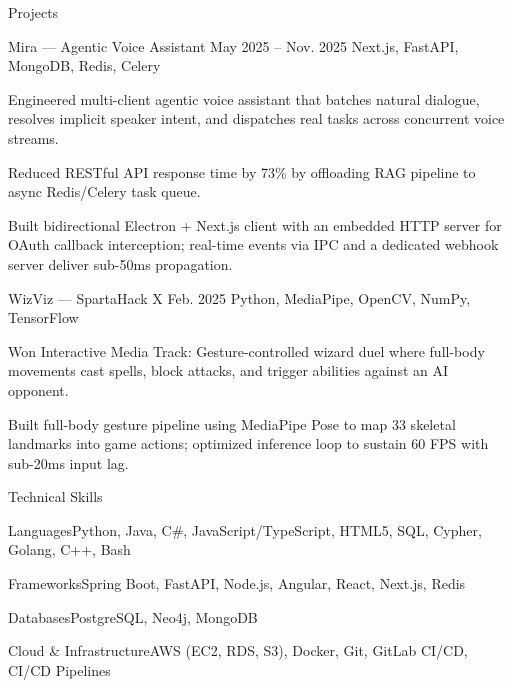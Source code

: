 \documentclass[
	11pt
]{../../../resume}
\begin{document}
	\begin{rSection}{P}{rojects}
		\begin{rSectionEntry}
			{Mira --- Agentic Voice Assistant}
			{May 2025 -- Nov. 2025}
			{}
			{Next.js, FastAPI, MongoDB, Redis, Celery}
			{}

			\item Engineered multi-client agentic voice assistant that batches natural dialogue, resolves implicit speaker intent, and dispatches real tasks across concurrent voice streams.
			\item Reduced RESTful API response time by 73\% by offloading RAG pipeline to async Redis/Celery task queue.
			\item Built bidirectional Electron + Next.js client with an embedded HTTP server for OAuth callback interception; real-time events via IPC and a dedicated webhook server deliver sub-50ms propagation.
		\end{rSectionEntry}

		\begin{rSectionEntry}
			{WizViz --- SpartaHack X}
			{Feb. 2025}
			{}
			{Python, MediaPipe, OpenCV, NumPy, TensorFlow}
			{}

			\item Won Interactive Media Track: Gesture-controlled wizard duel where full-body movements cast spells, block attacks, and trigger abilities against an AI opponent.
			\item Built full-body gesture pipeline using MediaPipe Pose to map 33 skeletal landmarks into game actions; optimized inference loop to sustain 60 FPS with sub-20ms input lag.
		\end{rSectionEntry}
	\end{rSection}

	\begin{rSection}{T}{echnical Skills}
		\begin{rSet}{Languages}{Python, Java, C\#, JavaScript/TypeScript, HTML5, SQL, Cypher, Golang, C++, Bash}
		\end{rSet}
		\begin{rSet}{Frameworks}{Spring Boot, FastAPI, Node.js, Angular, React, Next.js, Redis}
		\end{rSet}
		\begin{rSet}{Databases}{PostgreSQL, Neo4j, MongoDB}
		\end{rSet}
		\begin{rSet}{Cloud \& Infrastructure}{AWS (EC2, RDS, S3), Docker, Git, GitLab CI/CD, CI/CD Pipelines}
		\end{rSet}
	\end{rSection}
\end{document}
